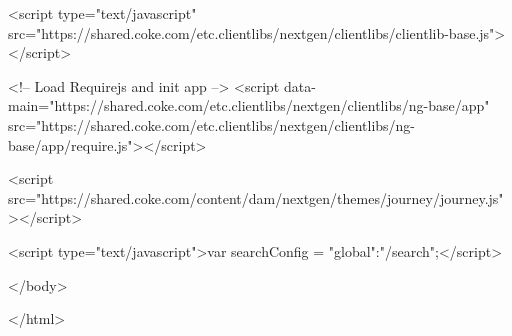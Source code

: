     <script type="text/javascript" src="https://shared.coke.com/etc.clientlibs/nextgen/clientlibs/clientlib-base.js"></script>
	
	<!-- Load Requirejs and init app -->
	<script data-main="https://shared.coke.com/etc.clientlibs/nextgen/clientlibs/ng-base/app" src="https://shared.coke.com/etc.clientlibs/nextgen/clientlibs/ng-base/app/require.js"></script>

	
	<script src="https://shared.coke.com/content/dam/nextgen/themes/journey/journey.js"></script>


    

    


        

    

    <script type="text/javascript">var searchConfig = {"global":"/search"};</script>
    
    
    
    
</body>

</html>